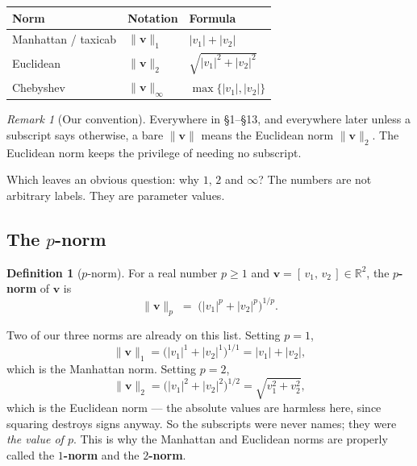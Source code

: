 \documentclass[11pt]{article}
\theoremstyle{definition}
\newtheorem{defn}{Definition}[section]
\theoremstyle{remark}
\newtheorem*{rmk}{Remark}
\newcommand{\R}{\mathbb{R}}
\newcommand{\vc}[1]{\mathbf{#1}}
\newcommand{\norm}[1]{\lVert #1\rVert}
\begin{document}
\begin{center}
\renewcommand{\arraystretch}{1.6}
\begin{tabular}{@{}l l l@{}}
\toprule
\textbf{Norm} & \textbf{Notation} & \textbf{Formula} \\
\midrule
Manhattan / taxicab & $\norm{\vc{v}}_1$
  & $\lvert v_1\rvert+\lvert v_2\rvert$ \\
Euclidean           & $\norm{\vc{v}}_2$
  & $\sqrt{\lvert v_1\rvert^{2}+\lvert v_2\rvert^{2}}$ \\
Chebyshev           & $\norm{\vc{v}}_\infty$
  & $\max\bigl\{\lvert v_1\rvert,\lvert v_2\rvert\bigr\}$ \\
\bottomrule
\end{tabular}
\end{center}

\begin{rmk}[Our convention]
Everywhere in \S1--\S13, and everywhere later unless a subscript says
otherwise, a bare $\norm{\vc{v}}$ means the Euclidean norm $\norm{\vc{v}}_2$.
The Euclidean norm keeps the privilege of needing no subscript.
\end{rmk}

\noindent Which leaves an obvious question: why $1$, $2$ and $\infty$? The
numbers are not arbitrary labels. They are parameter values.

\subsection{The $p$-norm}
\begin{defn}[$p$-norm]
For a real number $p\ge 1$ and $\vc{v}=[\,v_1,\,v_2\,]\in\R^{2}$, the
\textbf{$p$-norm} of $\vc{v}$ is
\[
  \norm{\vc{v}}_p
  \;=\;
  \bigl(\lvert v_1\rvert^{p}+\lvert v_2\rvert^{p}\bigr)^{1/p} .
\]
\end{defn}

\noindent Two of our three norms are already on this list. Setting $p=1$,
\[
  \norm{\vc{v}}_1
  = \bigl(\lvert v_1\rvert^{1}+\lvert v_2\rvert^{1}\bigr)^{1/1}
  = \lvert v_1\rvert+\lvert v_2\rvert ,
\]
which is the Manhattan norm. Setting $p=2$,
\[
  \norm{\vc{v}}_2
  = \bigl(\lvert v_1\rvert^{2}+\lvert v_2\rvert^{2}\bigr)^{1/2}
  = \sqrt{v_1^{2}+v_2^{2}} ,
\]
which is the Euclidean norm --- the absolute values are harmless here, since
squaring destroys signs anyway. So the subscripts were never names; they were
\emph{the value of $p$}. This is why the Manhattan and Euclidean norms are
properly called the \textbf{$1$-norm} and the \textbf{$2$-norm}.
\end{document}
